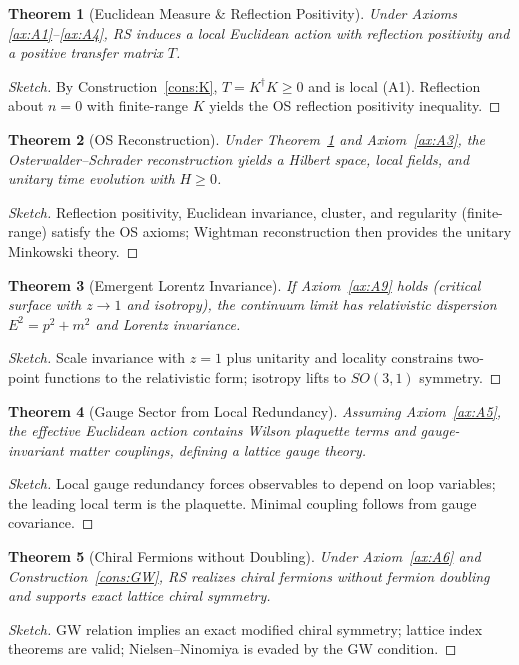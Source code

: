 \documentclass[11pt]{article}
\theoremstyle{plain}
\newtheorem{theorem}{Theorem}[section]
\theoremstyle{definition}
\theoremstyle{remark}
\begin{document}
\begin{theorem}[Euclidean Measure \& Reflection Positivity]\label{thm:euclid}
Under Axioms \ref{ax:A1}--\ref{ax:A4}, \textsf{RS} induces a local Euclidean action with reflection positivity and a positive transfer matrix $T$.
\end{theorem}
\begin{proof}[Sketch]
By Construction~\ref{cons:K}, $T=K^\dagger K\ge 0$ and is local (A1). Reflection about $n=0$ with finite-range $K$ yields the OS reflection positivity inequality.
\end{proof}

\begin{theorem}[OS Reconstruction]\label{thm:OS}
Under Theorem~\ref{thm:euclid} and Axiom~\ref{ax:A3}, the Osterwalder--Schrader reconstruction yields a Hilbert space, local fields, and unitary time evolution with $H\ge 0$.
\end{theorem}
\begin{proof}[Sketch]
Reflection positivity, Euclidean invariance, cluster, and regularity (finite-range) satisfy the OS axioms; Wightman reconstruction then provides the unitary Minkowski theory.
\end{proof}

\begin{theorem}[Emergent Lorentz Invariance]\label{thm:lorentz}
If Axiom~\ref{ax:A9} holds (critical surface with $z\to 1$ and isotropy), the continuum limit has relativistic dispersion $E^2=p^2+m^2$ and Lorentz invariance.
\end{theorem}
\begin{proof}[Sketch]
Scale invariance with $z=1$ plus unitarity and locality constrains two-point functions to the relativistic form; isotropy lifts to $SO(3,1)$ symmetry.
\end{proof}

\begin{theorem}[Gauge Sector from Local Redundancy]\label{thm:gauge}
Assuming Axiom~\ref{ax:A5}, the effective Euclidean action contains Wilson plaquette terms and gauge-invariant matter couplings, defining a lattice gauge theory.
\end{theorem}
\begin{proof}[Sketch]
Local gauge redundancy forces observables to depend on loop variables; the leading local term is the plaquette. Minimal coupling follows from gauge covariance.
\end{proof}

\begin{theorem}[Chiral Fermions without Doubling]\label{thm:GW}
Under Axiom~\ref{ax:A6} and Construction~\ref{cons:GW}, \textsf{RS} realizes chiral fermions without fermion doubling and supports exact lattice chiral symmetry.
\end{theorem}
\begin{proof}[Sketch]
GW relation implies an exact modified chiral symmetry; lattice index theorems are valid; Nielsen--Ninomiya is evaded by the GW condition.
\end{proof}
\end{document}
